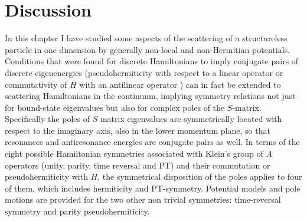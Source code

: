 \section{Discussion}
\label{sec:chapter2_Discussion}

In this chapter I have studied some aspects of the scattering of a structureless particle in one dimension by
generally non-local and non-Hermitian potentials. Conditions that were found for discrete Hamiltonians to imply conjugate pairs of discrete eigenenergies
(pseudohermiticity with respect to a linear operator or commutativity of $H$ with an antilinear operator \cite{Mostafazadeh2002,Mostafazadeh2002a,Mostafazadeh2002b}) can in fact be extended to scattering Hamiltonians in the continuum, implying symmetry relations not just for bound-state eigenvalues
but also for complex
poles of the $S$-matrix. Specifically the poles of $S$ matrix eigenvalues
are symmetrically located with respect to the imaginary axis, also in the lower momentum plane, so that resonances and antiresonance
energies are conjugate pairs as well.
In  terms of the eight possible Hamiltonian symmetries associated with Klein's group of $A$ operators (unity, parity, time reversal and PT)
and their commutation or pseudohermiticity with $H$,
the symmetrical disposition of the poles applies to four of them, which includes hermiticity and PT-symmetry. Potential models
and pole motions are provided for the
two other non trivial symmetries: time-reversal symmetry and parity pseudohermiticity.

